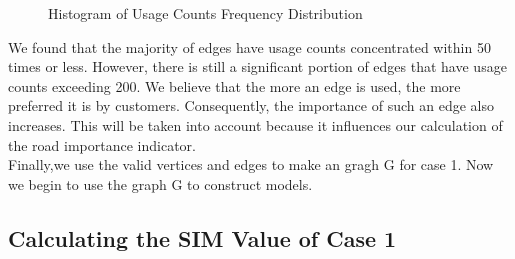 \begin{figure}[H]%
    \centering
    \caption{Histogram of Usage Counts Frequency Distribution}
\end{figure}
\indent We found that the majority of edges have usage counts concentrated within 50 times or less. However, there is still a significant portion of edges that have usage counts exceeding 200. We believe that the more an edge is used, the more preferred it is by customers. Consequently, the importance of such an edge also increases. This will be taken into account because it influences our calculation of the road importance indicator.\\
\indent Finally,we use the valid vertices and edges to make an gragh G for case 1. Now we begin to use the graph G to construct models. 

\subsection{Calculating the SIM Value of Case 1}

